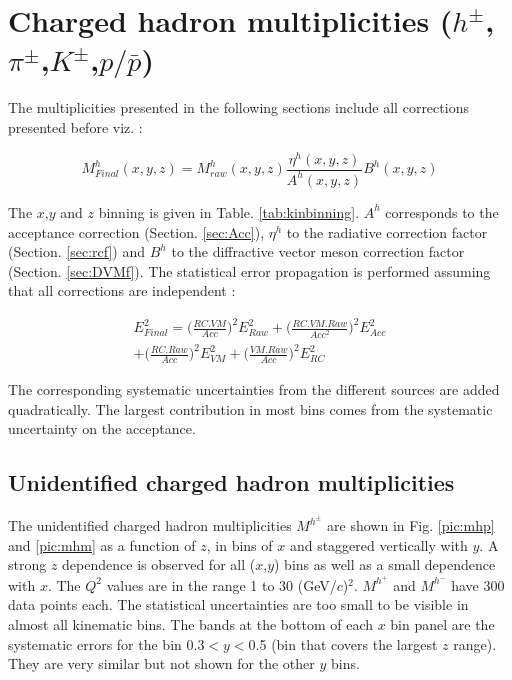 
\section{Charged hadron multiplicities ($h^{\pm}$,$\pi^{\pm}$,$K^{\pm}$,$p/\bar{p}$)}

The multiplicities presented in the following sections include all corrections presented before viz. :

\begin{equation}
  	M^h_{Final}(x,y,z) = M^h_{raw}(x,y,z)\frac{\eta^h(x,y,z)}{A^h(x,y,z)}B^h(x,y,z)
\end{equation}

The $x$,$y$ and $z$ binning is given in Table. \ref{tab:kinbinning}. $A^h$ corresponds to the acceptance correction (Section. \ref{sec:Acc}), $\eta^h$ to the radiative correction factor (Section. \ref{sec:rcf}) and $B^h$ to the diffractive vector meson correction factor (Section. \ref{sec:DVMf}). The statistical error propagation is performed assuming that all corrections are independent :

\begin{equation}
\begin{split}
		E^2_{Final} = \bigg( \frac{RC.VM}{Acc} \bigg)^2 E^2_{Raw} + \bigg(\frac{RC.VM.Raw}{Acc^2} \bigg)^2 E^2_{Acc} \\
		+ \bigg(\frac{RC.Raw}{Acc} \bigg)^2 E^2_{VM} + \bigg(\frac{VM.Raw}{Acc} \bigg)^2 E^2_{RC}
\end{split}
\end{equation}

The corresponding systematic uncertainties from the different sources are added quadratically. The largest contribution in most bins comes from the systematic uncertainty on the acceptance.

\subsection{Unidentified charged hadron multiplicities}

The unidentified charged hadron multiplicities $M^{h^{\pm}}$ are shown in Fig. \ref{pic:mhp} and \ref{pic:mhm} as a function of $z$, in bins of $x$ and staggered vertically with $y$. A strong $z$ dependence is observed for all ($x$,$y$) bins as well as a small dependence with $x$. The $Q^2$ values are in the range 1 to 30 (GeV/$c$)$^2$. $M^{h^+}$ and $M^{h^-}$ have 300 data points each. The statistical uncertainties are too small to be visible in almost all kinematic bins. The bands at the bottom of each $x$ bin panel are the systematic errors for the bin 0.3$< y <$0.5 (bin that covers the largest $z$ range). They are very similar but not shown for the other $y$ bins.

